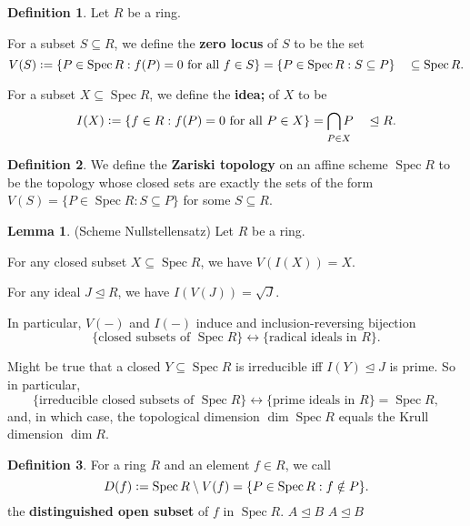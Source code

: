 \documentclass[12pt]{article}
\makeatletter
\newlength{\myparskip}
\newenvironment{fullbox}{\begin{lrbox}{\savefullbox}\begin{minipage}{\dimexpr\textwidth-2\fboxsep\relax}\setlength{\parskip}{\myparskip}}{\end{minipage}\end{lrbox}\framebox[\textwidth]{\usebox{\savefullbox}}}
\theoremstyle{definition}
\newtheorem{lem}{Lemma}
\newtheorem{defn}{Definition}
\newenvironment{bprop}{\begin{fullbox}\begin{lem}}{\end{lem}\end{fullbox}}
\newenvironment{bdefn}{\begin{fullbox}\begin{defn}}{\end{defn}\end{fullbox}}
\newcommand{\<}{\langle}
\renewcommand{\>}{\rangle}
\newcommand{\sseq}{\subseteq}
\newcommand{\teq}{\trianglelefteq}
\newcommand*{\rad}{\sqrt}
\DeclareMathOperator{\Spec}{Spec}
\newcommand*{\longlimit}[2]{
    {
        \def\arraystretch{0}
        \begin{array}[t]{@{}l@{}}
            \displaystyle{#2} \\[8.5pt] \scriptstyle{#1}
        \end{array}
    }
}
\newcommand*{\longcap}[2]{\longlimit{#1}{\bigcap #2}}
\newcommand*{\defeq}{\mathrel{\vcenter{\baselineskip0.7ex \lineskiplimit0pt \hbox{.}\hbox{.}}}=}
\makeatother
\begin{document}
\begin{bdefn}
    Let $R$ be a ring.

    For a subset $S \sseq R$, we define the \textbf{zero locus} of $S$ to be the set
    \[
        V(S) 
            \defeq \{P \in \Spec R : f(P) = 0 \text{ for all } f \in S\}
            = \{P \in \Spec R : S \sseq P\}
            \quad \sseq \Spec R.
    \]

    For a subset $X \sseq \Spec R$, we define the \textbf{idea;} of $X$ to be
    \[
        I(X) 
            \defeq \{f \in R : f(P) = 0 \text{ for all } P \in X\}
            = \longcap{P \in X}{P}
            \quad\teq R.
    \]
\end{bdefn}

\begin{bdefn}
    We define the \textbf{Zariski topology} on an affine scheme $\Spec R$ to be the topology whose closed sets are exactly the sets of the form $V(S) = \{P \in \Spec R : S \subseteq P\}$ for some $S \subseteq R$.
\end{bdefn}

\begin{bprop}
    (Scheme Nullstellensatz) Let $R$ be a ring.

    For any closed subset $X \subseteq \Spec R$, we have $V(I(X)) = X$.

    For any ideal $J \teq R$, we have $I(V(J)) = \rad{J}$.

    In particular, $V(-)$ and $I(-)$ induce and inclusion-reversing bijection
    \[
        \{\text{closed subsets of $\Spec R$}\} \longleftrightarrow \{\text{radical ideals in $R$}\}.
    \]
\end{bprop}

Might be true that a closed $Y \subseteq \Spec R$ is irreducible iff $I(Y) \teq J$ is prime. So in particular,
\[
    \{\text{irreducible closed subsets of $\Spec R$}\} 
    \longleftrightarrow \{\text{prime ideals in $R$}\}
    = \Spec R,
\]
and, in which case, the topological dimension $\dim \Spec R$  equals the Krull dimension $\dim R$.

\begin{bdefn}
    For a ring $R$ and an element $f \in R$, we call
    \[
        D(f) 
            \defeq \Spec R \setminus V(f)
            = \{P \in \Spec R : f \notin P\}.
    \]
    the \textbf{distinguished open subset} of $f$ in $\Spec R$. $A \unlhd B$ $A \teq B$
\end{bdefn}
\end{document}
